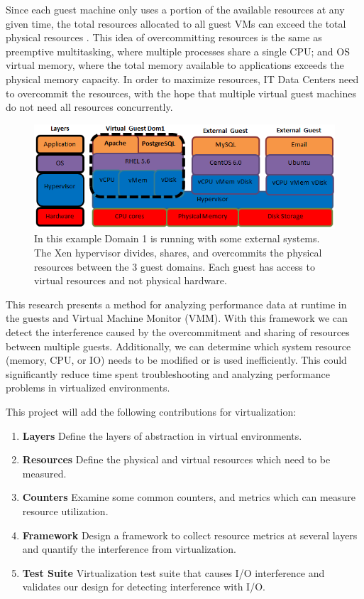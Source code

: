 \indent Since each guest machine only uses a portion of the available resources at any given time, the total resources allocated to all guest VMs can exceed the total physical resources \cite{huber2, amit, buell1}.   This idea of overcommitting resources is the same as preemptive multitasking, where multiple processes share a single CPU; and OS virtual memory, where the total memory available to applications exceeds the physical memory capacity.  In order to maximize resources, IT Data Centers need to overcommit the resources, with the hope that multiple virtual guest machines do not need all resources concurrently.  

\begin{figure}[!h]
  \begin{center}
  \includegraphics[width=6in]{images/LayersAll.png}
  \caption{In this example Domain 1 is running with some external systems.  The Xen hypervisor  divides, shares, and overcommits the physical resources between the 3 guest domains.  Each guest has access to virtual resources and not physical hardware.}
  \label{virtStack}
  \end{center}
\end{figure}

\indent This research presents a method for analyzing performance data at runtime in the guests and Virtual Machine Monitor (VMM).   With this framework we can detect the interference caused by the overcommitment and sharing of resources between multiple guests.  Additionally, we can determine which system resource (memory, CPU, or IO) needs to be modified or is used inefficiently.  This could significantly reduce time spent troubleshooting and analyzing performance problems in virtualized environments.

\indent This project will add the following contributions for virtualization:
\begin{enumerate}
\item \textbf{Layers} Define the layers of abstraction in virtual environments.
\item \textbf{Resources} Define the physical and virtual resources which need to be measured.
\item \textbf{Counters} Examine some common counters, and metrics which can measure resource utilization.
\item \textbf{Framework} Design a framework to collect resource metrics at several layers and quantify the interference from virtualization.
\item \textbf{Test Suite} Virtualization test suite that causes I/O interference and validates our design for detecting interference with I/O.
\end{enumerate}

